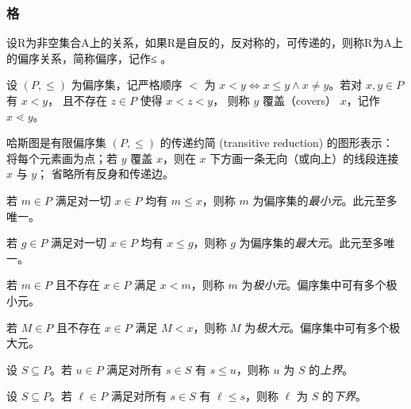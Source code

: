 \subsubsection{格}
\begin{definition}
  设R为非空集合A上的关系，如果R是自反的，反对称的，可传递的，则称R为A上的偏序关系，简称偏序，记作≤ 。
\end{definition}

\begin{definition}
  设 $(P,\le)$ 为偏序集，记严格顺序 $<$ 为 $x<y\iff x\le y\land x\neq y$。若对 $x,y\in P$ 有 $x<y$，
  且不存在 $z\in P$ 使得 $x<z<y$，
  则称 $y$ 覆盖（covers） $x$，记作 $x\lessdot y$。  
\end{definition}

\begin{definition}
    哈斯图是有限偏序集 $(P,\le)$ 的传递约简 (transitive reduction) 的图形表示：
    将每个元素画为点；若 $y$ 覆盖 $x$，则在 $x$ 下方画一条无向（或向上）的线段连接 $x$ 与 $y$；
    省略所有反身和传递边。  
\end{definition}

\begin{definition}
 若 $m\in P$ 满足对一切 $x\in P$ 均有 $m\le x$，则称 $m$ 为偏序集的\emph{最小元}。此元至多唯一。  
\end{definition}
\begin{definition}
  若 $g\in P$ 满足对一切 $x\in P$ 均有 $x\le g$，则称 $g$ 为偏序集的\emph{最大元}。此元至多唯一。  
\end{definition}

\begin{definition}
   若 $m\in P$ 且不存在 $x\in P$ 满足 $x<m$，则称 $m$ 为\emph{极小元}。偏序集中可有多个极小元。  
\end{definition}

\begin{definition}
  若 $M\in P$ 且不存在 $x\in P$ 满足 $M<x$，则称 $M$ 为\emph{极大元}。偏序集中可有多个极大元。  
\end{definition}
      
\begin{definition}
   设 $S\subseteq P$。若 $u\in P$ 满足对所有 $s\in S$ 有 $s\le u$，则称 $u$ 为 $S$ 的\emph{上界}。  
\end{definition}

\begin{definition}
  设 $S\subseteq P$。若 $\ell\in P$ 满足对所有 $s\in S$ 有 $\ell\le s$，则称 $\ell$ 为 $S$ 的\emph{下界}。  
\end{definition}

